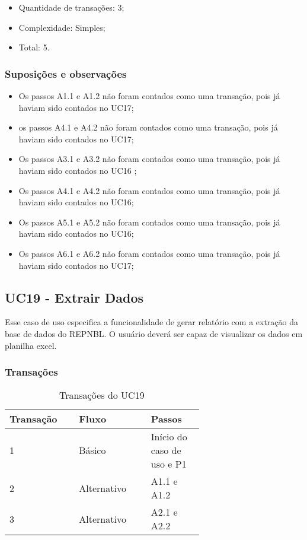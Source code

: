   \begin{itemize}
  \item Quantidade de transações: 3;
  \item Complexidade: Simples;
  \item Total: 5.
  \end{itemize}
  
  \subsubsection{Suposições e observações}
  
  \begin{itemize}
   \item Os passos A1.1 e A1.2 não foram contados como uma transação, pois já haviam sido contados no UC17;	
   \item os passos A4.1 e A4.2 não foram contados como uma transação, pois já haviam sido contados no UC17;	
   \item Os passos A3.1 e A3.2 não foram contados como uma transação, pois já haviam sido contados no UC16	;
   \item Os passos A4.1 e A4.2 não foram contados como uma transação, pois já haviam sido contados no UC16;	
   \item Os passos A5.1 e A5.2 não foram contados como uma transação, pois já haviam sido contados no UC16;
   \item Os passos A6.1 e A6.2 não foram contados como uma transação, pois já haviam sido contados no UC17;
  \end{itemize}
  
  \vfill
  
  
  
\pagebreak
\subsection{UC19 - Extrair Dados}
  
  Esse caso de uso especifica a funcionalidade de gerar relatório com a extração da base de dados do REPNBL. 
  O usuário deverá ser capaz de visualizar os dados em planilha excel.

  \subsubsection{Transações}

  \begin{table*}[!h]
  \centering
  \caption{Transações do UC19}
  \label{uc17_transactions}
    \begin{tabular}{|p{0.20\linewidth}|p{0.25\linewidth}|p{0.20\linewidth}|}
    \hline
    \textbf{Transação} & \textbf{Fluxo} & \textbf{Passos} \\ 
    \hline
    1 & Básico & Início do caso de uso e P1\\
    \hline
    2 & Alternativo & A1.1 e A1.2\\
    \hline
    3 & Alternativo & A2.1 e A2.2\\
    \hline
    \end{tabular}
  \end{table*}

